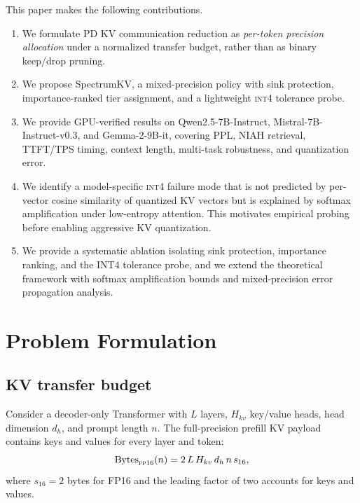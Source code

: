 \documentclass[11pt]{article}
\newcommand{\method}{SpectrumKV}
\newcommand{\niah}{NIAH}
\newcommand{\fp}{\textsc{fp16}}
\newcommand{\intiv}{\textsc{int4}}
\theoremstyle{plain}
\theoremstyle{definition}
\begin{document}
This paper makes the following contributions.
\begin{enumerate}[leftmargin=1.6em,itemsep=2pt]
    \item We formulate PD KV communication reduction as \emph{per-token precision allocation} under a normalized transfer budget, rather than as binary keep/drop pruning.
    \item We propose \method{}, a mixed-precision policy with sink protection, importance-ranked tier assignment, and a lightweight \intiv{} tolerance probe.
    \item We provide GPU-verified results on Qwen2.5-7B-Instruct, Mistral-7B-Instruct-v0.3, and Gemma-2-9B-it, covering PPL, \niah{} retrieval, TTFT/TPS timing, context length, multi-task robustness, and quantization error.
    \item We identify a model-specific \intiv{} failure mode that is not predicted by per-vector cosine similarity of quantized KV vectors but is explained by softmax amplification under low-entropy attention.  This motivates empirical probing before enabling aggressive KV quantization.
    \item We provide a systematic ablation isolating sink protection, importance ranking, and the INT4 tolerance probe, and we extend the theoretical framework with softmax amplification bounds and mixed-precision error propagation analysis.
\end{enumerate}

\section{Problem Formulation}
\label{sec:formulation}

\subsection{KV transfer budget}
Consider a decoder-only Transformer with $L$ layers, $H_{kv}$ key/value heads, head dimension $d_h$, and prompt length $n$.  The full-precision prefill KV payload contains keys and values for every layer and token:
\begin{equation}
  \mathrm{Bytes}_{\fp{}}(n)= 2\,L\,H_{kv}\,d_h\,n\,s_{16},
  \label{eq:fullbytes}
\end{equation}
where $s_{16}=2$ bytes for FP16 and the leading factor of two accounts for keys and values.
\end{document}
